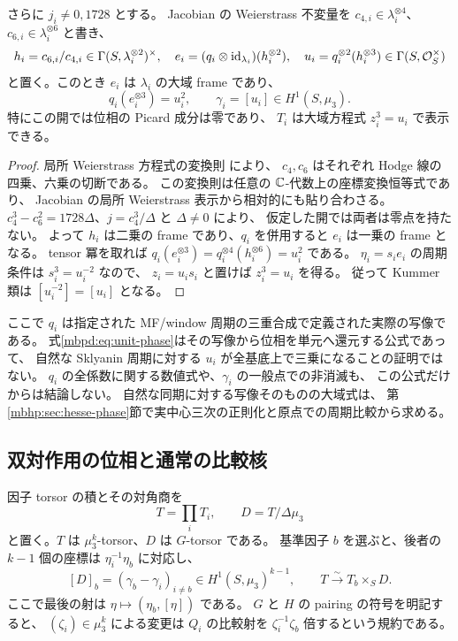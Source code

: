 \begin{corollary}[基本 $j$-開における位相の単元表示]
\label{mbpd:cor:unit-phase}
さらに $j_i\ne0,1728$ とする。
Jacobian の Weierstrass 不変量を
$c_{4,i}\in\lambda_i^{\otimes4}$、$c_{6,i}\in\lambda_i^{\otimes6}$ と書き、
\[
 h_i=c_{6,i}/c_{4,i}\in\Gamma(S,\lambda_i^{\otimes2})^\times,
 \quad e_i=(q_i\otimes\mathrm{id}_{\lambda_i})(h_i^{\otimes2}),
 \quad u_i=q_i^{\otimes2}(h_i^{\otimes3})\in\Gamma(S,\mathcal O_S^\times)
\]
と置く。このとき $e_i$ は $\lambda_i$ の大域 frame であり、
\begin{equation}\label{mbpd:eq:unit-phase}
 q_i(e_i^{\otimes3})=u_i^2,
 \qquad \gamma_i=[u_i]\in H^1(S,\mu_3).
\end{equation}
特にこの開では位相の Picard 成分は零であり、
$T_i$ は大域方程式 $z_i^3=u_i$ で表示できる。
\end{corollary}
\begin{proof}
局所 Weierstrass 方程式の変換則
\cite[Chapter~III, \S1, Table~3.1]{NFMSilvermanArithmetic}により、
$c_4,c_6$ はそれぞれ Hodge 線の四乗、六乗の切断である。
この変換則は任意の $\mathbb C$-代数上の座標変換恒等式であり、
Jacobian の局所 Weierstrass 表示から相対的にも貼り合わさる。
$c_4^3-c_6^2=1728\Delta$、$j=c_4^3/\Delta$ と $\Delta\ne0$ により、
仮定した開では両者は零点を持たない。
よって $h_i$ は二乗の frame であり、$q_i$ を併用すると $e_i$ は一乗の frame となる。
tensor 冪を取れば
$q_i(e_i^{\otimes3})=q_i^{\otimes4}(h_i^{\otimes6})=u_i^2$ である。
$\eta_i=s_i e_i$ の周期条件は $s_i^3=u_i^{-2}$ なので、
$z_i=u_i s_i$ と置けば $z_i^3=u_i$ を得る。
従って Kummer 類は $[u_i^{-2}]=[u_i]$ となる。
\end{proof}

ここで $q_i$ は指定された MF/window 周期の三重合成で定義された実際の写像である。
式\eqref{mbpd:eq:unit-phase}はその写像から位相を単元へ還元する公式であって、
自然な Sklyanin 周期に対する $u_i$ が全基底上で三乗になることの証明ではない。
$q_i$ の全係数に関する数値式や、$\gamma_i$ の一般点での非消滅も、
この公式だけからは結論しない。
自然な同期に対する写像そのものの大域式は、
第\ref{mbhp:sec:hesse-phase}節で実中心三次の正則化と原点での周期比較から求める。

\subsection{双対作用の位相と通常の比較核}

因子 torsor の積とその対角商を
\begin{equation}\label{mbpd:eq:phase-quotient}
 T=\prod_i T_i,
 \qquad D=T/\Delta\mu_3
\end{equation}
と置く。$T$ は $\mu_3^k$-torsor、$D$ は $G$-torsor である。
基準因子 $b$ を選ぶと、後者の $k-1$ 個の座標は
$\eta_i^{-1}\eta_b$ に対応し、
\begin{equation}\label{mbpd:eq:difference-classes}
 [D]_b=(\gamma_b-\gamma_i)_{i\ne b}
       \in H^1(S,\mu_3)^{k-1},
 \qquad T\xrightarrow{\sim}T_b\times_SD.
\end{equation}
ここで最後の射は $\eta\mapsto(\eta_b,[\eta])$ である。
$G$ と $H$ の pairing の符号を明記すると、
$(\zeta_i)\in\mu_3^k$ による変更は $Q_i$ の比較射を
$\zeta_i^{-1}\zeta_b$ 倍するという規約である。

